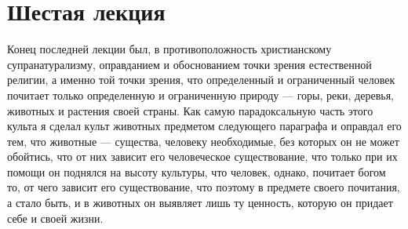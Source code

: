 \documentclass[12pt]{article}
\begin{document}
\section*{Шестая лекция}

Конец последней лекции был, в противоположность христианскому супранатурализму, оправданием и обоснованием точки зрения естественной религии, а именно той точки зрения, что определенный и ограниченный человек почитает только определенную и ограниченную природу --- горы, реки, деревья, животных и растения своей страны. Как самую парадоксальную часть этого культа я сделал культ животных предметом следующего параграфа и оправдал его тем, что животные --- существа, человеку необходимые, без которых он не может обойтись, что от них зависит его человеческое существование, что только при их помощи он поднялся на высоту культуры, что человек, однако, почитает богом то, от чего зависит его существование, что поэтому в предмете своего почитания, а стало быть, и в животных он выявляет лишь ту ценность, которую он придает себе и своей жизни. 
\end{document}
